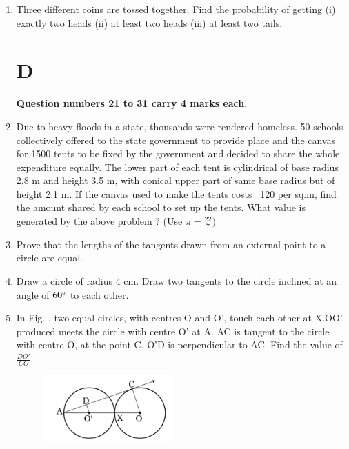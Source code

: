 \documentclass[journal,12pt,twocolumn]{IEEEtran}
\begin{document}
\begin{enumerate}
\item  Three different coins are tossed together. Find the probability of getting (i) exactly two heads (ii) at least two heads (iii) at least two tails.\\
 
\section{\textbf{D}}  
\textbf{Question numbers 21 to 31 carry 4 marks each.} \\

\item  Due to heavy floods in a state, thousands were rendered homeless. 50 schools collectively offered to the state government to provide place and the canvas for 1500 tents to be fixed by the government and decided to share the whole expenditure equally. The lower part of each tent is cylindrical of base radius 2.8 m and height 3.5 m, with conical upper part of same base radius but of height 2.1 m. If the canvas used to make the tents costs \rupee~120 per sq.m, find the amount shared by each school to set up the tents. What value is generated by the above problem ? (Use $ \pi = \frac{22}{7} ) $\\
 
\item Prove that the lengths of the tangents drawn from an external point to a circle are equal.\\

\item Draw a circle of radius 4 cm. Draw two tangents to the circle inclined at an angle of $ 60 \degree $ to each other.\\

\item In Fig. , two equal circles, with centres O and O', touch each other at X.OO' produced meets the circle with centre O' at A. AC is tangent to the circle with centre O, at the point C. O'D is perpendicular to AC. Find the value of $\frac{DO'}{CO}$.\\
	\begin{figure}[H]
      \centering
      \includegraphics[width=5cm]{7.png}
      \label{fig:my_label}
   \end{figure} 
 

\end{enumerate}
\end{document}
